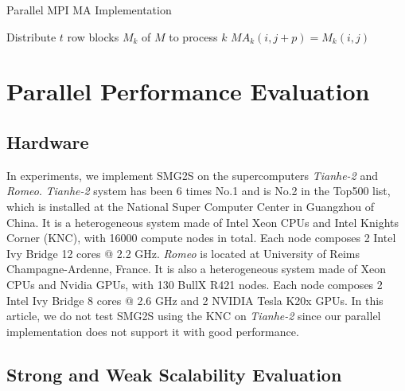 \begin{algorithm}[htbp]{}
	\caption{Parallel MPI MA Implementation} 
	\label{alg:ma}   
	\begin{algorithmic}[1]
		\State Distribute $t$ row blocks $M_k$ of $M$ to process $k$ 
		\State $MA_k(i,j+p) = M_k(i,j)$
		\EndIf
		\EndFor
		\EndFor 
		\EndFunction
	\end{algorithmic} 
	
\end{algorithm}

\section{Parallel Performance Evaluation}\label{Parallel Performance Evaluation}
\subsection{Hardware}
In experiments, we implement SMG2S on the supercomputers \textit{Tianhe-2} and \textit{Romeo}. \textit{Tianhe-2} system has been 6 times No.1 and is No.2 in the Top500 list, which is installed at the National Super Computer Center in Guangzhou of China. It is a heterogeneous system made of Intel Xeon CPUs and Intel Knights Corner (KNC), with 16000 compute nodes in total. Each node composes 2 Intel Ivy Bridge 12 cores @ 2.2 GHz. \textit{Romeo} is located at University of Reims Champagne-Ardenne, France. It is also a heterogeneous system made of Xeon CPUs and Nvidia GPUs, with 130 BullX R421 nodes. Each node composes 2 Intel Ivy Bridge 8 cores @ 2.6 GHz and 2 NVIDIA Tesla K20x GPUs. In this article, we do not test SMG2S using the KNC on \textit{Tianhe-2} since our parallel implementation does not support it with good performance.
\subsection{Strong and Weak Scalability Evaluation}

